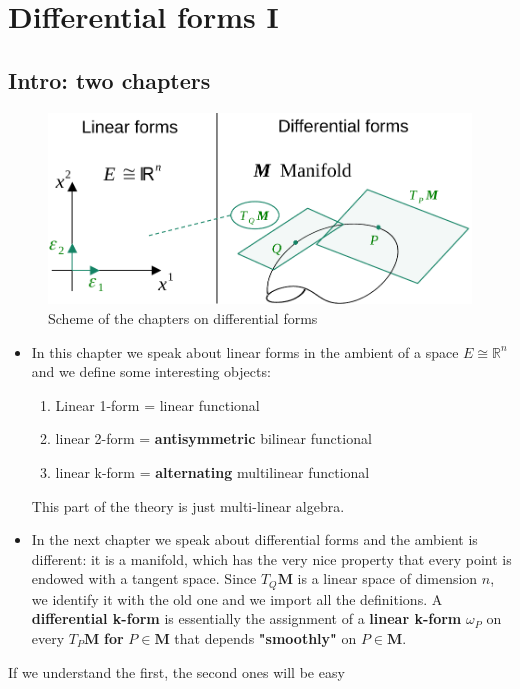 \documentclass[../main.tex]{subfiles}
\begin{document}
\setchapterpreamble[u]{\margintoc}
\chapter[Differential forms I]{Differential forms I\footnotemark[0]}
\section*{Intro: two chapters}
\begin{figure}[H]
	\includegraphics{images/differential_forms_scheme.pdf}
	\caption[Scheme of the chapters on differential forms]{Scheme of the chapters on differential forms}
\end{figure}
\begin{itemize}
    \item In this chapter we speak about linear forms in the ambient of a space $E\cong \mathbb{R}^n$ and we define some interesting objects:
    \begin{enumerate}
        \item Linear 1-form = linear functional
        \item linear 2-form = \textbf{antisymmetric} bilinear functional
        \item linear k-form = \textbf{alternating} multilinear functional
    \end{enumerate}
    This part of the theory is just multi-linear algebra.
    \item In the next chapter we speak about differential forms and the ambient is different: it is a manifold, which has the very nice property that every point is endowed with a tangent space. Since $T_Q\mathbf{M}$ is a linear space of dimension $n$, we identify it with the old one and we import all the definitions. A \textbf{differential k-form} is essentially the assignment of a \textbf{linear k-form} $\omega_P$ on every $T_P\mathbf{M}$ \textbf{for} $P\in\mathbf{M}$ that depends \textbf{"smoothly"} on $P\in \mathbf{M}$.
\end{itemize}
If we understand the first, the second ones will be easy 
\end{document}
